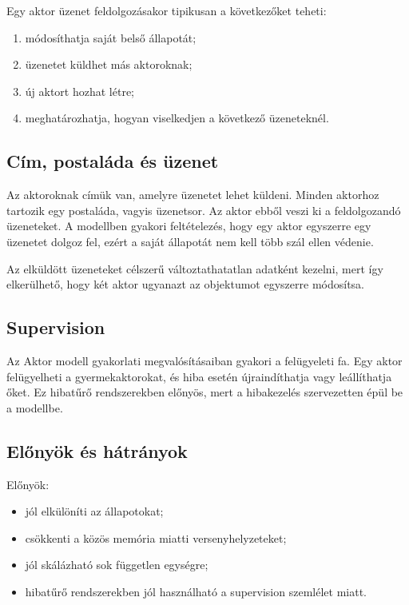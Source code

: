 Egy aktor üzenet feldolgozásakor tipikusan a következőket teheti:

\begin{enumerate}
  \item módosíthatja saját belső állapotát;
  \item üzenetet küldhet más aktoroknak;
  \item új aktort hozhat létre;
  \item meghatározhatja, hogyan viselkedjen a következő üzeneteknél.
\end{enumerate}

\subsection{Cím, postaláda és üzenet}

Az aktoroknak címük van, amelyre üzenetet lehet küldeni. Minden aktorhoz tartozik egy postaláda, vagyis üzenetsor. Az aktor ebből veszi ki a feldolgozandó üzeneteket. A modellben gyakori feltételezés, hogy egy aktor egyszerre egy üzenetet dolgoz fel, ezért a saját állapotát nem kell több szál ellen védenie.

Az elküldött üzeneteket célszerű változtathatatlan adatként kezelni, mert így elkerülhető, hogy két aktor ugyanazt az objektumot egyszerre módosítsa.



\subsection{Supervision}

Az Aktor modell gyakorlati megvalósításaiban gyakori a felügyeleti fa. Egy aktor felügyelheti a gyermekaktorokat, és hiba esetén újraindíthatja vagy leállíthatja őket. Ez hibatűrő rendszerekben előnyös, mert a hibakezelés szervezetten épül be a modellbe.

\subsection{Előnyök és hátrányok}

Előnyök:

\begin{itemize}
  \item jól elkülöníti az állapotokat;
  \item csökkenti a közös memória miatti versenyhelyzeteket;
  \item jól skálázható sok független egységre;
  \item hibatűrő rendszerekben jól használható a supervision szemlélet miatt.
\end{itemize}

